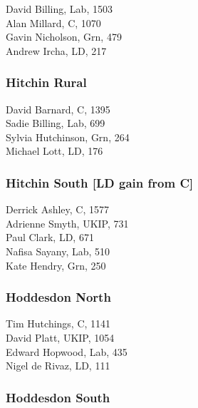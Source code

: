 \documentclass[a4paper,openany,10pt]{book}
\begin{document}


David Billing, Lab, 1503\\
Alan Millard, C, 1070\\
Gavin Nicholson, Grn, 479\\
Andrew Ircha, LD, 217\\


\subsubsection*{Hitchin Rural}



David Barnard, C, 1395\\
Sadie Billing, Lab, 699\\
Sylvia Hutchinson, Grn, 264\\
Michael Lott, LD, 176\\


\subsubsection*{Hitchin South \hspace*{\fill}\nolinebreak[1]%
\enspace\hspace*{\fill}
[LD gain from C]}



Derrick Ashley, C, 1577\\
Adrienne Smyth, UKIP, 731\\
Paul Clark, LD, 671\\
Nafisa Sayany, Lab, 510\\
Kate Hendry, Grn, 250\\


\subsubsection*{Hoddesdon North}



Tim Hutchings, C, 1141\\
David Platt, UKIP, 1054\\
Edward Hopwood, Lab, 435\\
Nigel de Rivaz, LD, 111\\


\subsubsection*{Hoddesdon South}
\end{document}
